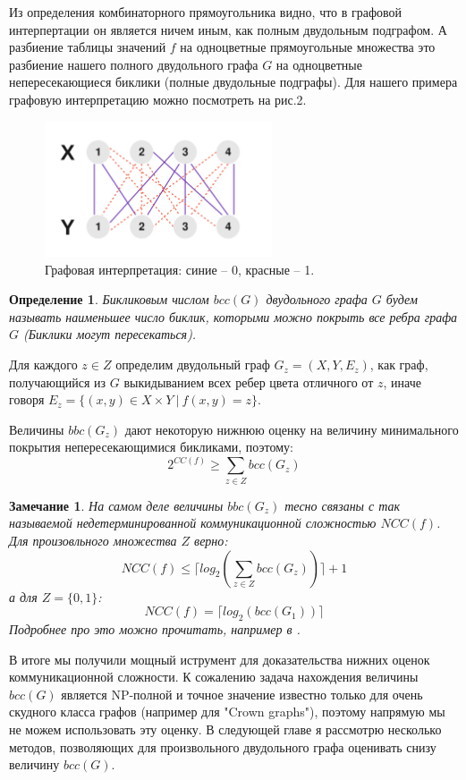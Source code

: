 \documentclass[a4paper]{article}
\newtheorem*{mremark}{Замечание}
\newtheorem*{mdefinition}{Определение}
\begin{document}
Из определения комбинаторного прямоугольника видно, что в графовой интерпертации он является ничем
иным, как полным двудольным подграфом. А разбиение таблицы значений $f$ на одноцветные прямоугольные
множества это разбиение нашего  полного двудольного графа $G$ на одноцветные непересекающиеся биклики 
(полные двудольные подграфы). Для нашего примера графовую интерпретацию можно посмотреть на рис.2.

\begin{figure}
	\centering
	\includegraphics[width=0.6\textwidth]{images/biclique.png}
	\caption{Графовая интерпретация: синие -- 0, красные -- 1.}
\end{figure}

\begin{mdefinition}
    Бикликовым числом $bcc(G)$ двудольного графа $G$ будем называть наименьшее число биклик, которыми 
    можно покрыть все ребра графа $G$ (Биклики могут пересекаться).
\end{mdefinition}

Для каждого $z \in Z$ определим двудольный граф $G_z = (X, Y, E_z)$, как граф, получающийся из $G$ 
выкидыванием всех ребер цвета отличного от $z$, иначе говоря $E_z = \{(x,y)\in X\times Y\ |\ f(x, y) = z \}$.

Величины $bbc(G_z)$ дают некоторую нижнюю оценку на величину минимального покрытия непересекающимися 
бикликами, поэтому: $$2^{CC(f)}\geq \sum\limits_{z\in Z}bcc(G_z)$$

\begin{mremark}
    На самом деле величины $bbc(G_z)$ тесно связаны с так называемой недетерминированной 
    коммуникационной сложностью $NCC(f)$. Для произовльного множества $Z$ верно: 
    $$NCC(f) \leq \lceil log_2(\sum\limits_{z\in Z}bcc(G_z))\rceil + 1$$ а для 
    $Z = \{0, 1\}$: $$NCC(f) = \lceil log_2(bcc(G_1))\rceil$$ 
    Подробнее про это можно прочитать, например в \cite{Razborov}.
\end{mremark}

В итоге мы получили мощный иструмент для доказательства нижних оценок коммуникационной сложности. 
К сожалению задача нахождения величины $bcc(G)$ является NP-полной \cite{GareyJhonson} и точное 
значение известно только для очень скудного класса графов (например для "Crown graphs"), поэтому 
напрямую мы не можем использовать эту оценку. В следующей главе я рассмотрю несколько методов, 
позволяющих для произвольного двудольного графа оценивать снизу величину $bcc(G)$.
\end{document}
